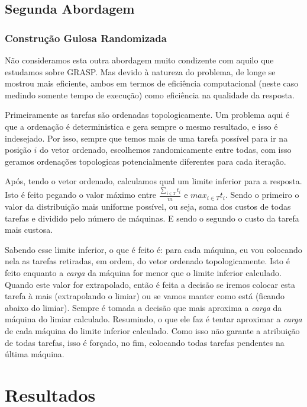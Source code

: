 \documentclass{report}
\begin{document}
\section{Segunda Abordagem}

\subsection{Construção Gulosa Randomizada}

Não consideramos esta outra abordagem muito condizente com aquilo que estudamos
sobre GRASP.
Mas devido à natureza do
problema, de longe se mostrou  mais eficiente, ambos em termos de
eficiência computacional (neste caso medindo
somente tempo de execução) como eficiência na qualidade da resposta.

Primeiramente as tarefas são ordenadas topologicamente.
Um problema aqui é que a ordenação é deterministica e gera
sempre o mesmo resultado, e isso é indesejado.
Por isso, sempre que temos mais de uma tarefa possível para ir na
posição $i$ do vetor ordenado, escolhemos randomicamente entre todas,
com isso geramos ordenações topologicas
potencialmente diferentes para cada iteração.

Após, tendo o vetor ordenado, calculamos qual um limite inferior para a
resposta. Isto é feito pegando o valor máximo entre $\frac{\sum_{i\in T}t_i}{m}$ e $max_{i\in T}t_i$. Sendo o primeiro
o valor da distribuição mais uniforme possível, ou seja, soma dos custos de todas tarefas e dividido pelo
número de máquinas. E sendo o segundo o custo da tarefa mais custosa.

Sabendo esse limite inferior, o que é feito é: para cada máquina, eu vou colocando nela as tarefas retiradas, em ordem,
do vetor ordenado topologicamente. Isto é feito enquanto a \emph{carga} da máquina for menor que o limite inferior
calculado. Quando este valor for extrapolado, então é feita a decisão se iremos colocar esta tarefa à mais
(extrapolando o limiar) ou se vamos manter como está (ficando abaixo do limiar). Sempre é tomada a decisão que mais
aproxima a \emph{carga} da máquina do limiar calculado. Resumindo, o que ele faz é tentar aproximar a \emph{carga} de
cada máquina do limite inferior calculado. Como isso não garante a atribuição de todas tarefas, isso é forçado, no fim,
colocando todas tarefas pendentes na última máquina.

\chapter{Resultados}
\end{document}
